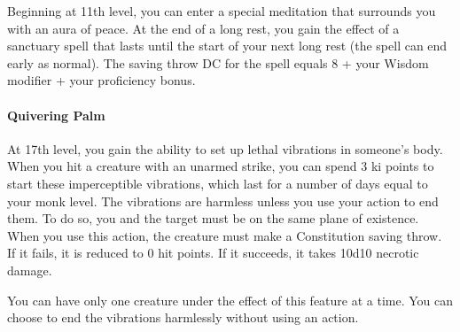 \documentclass[
]{article}
\begin{document}
Beginning at 11th level, you can enter a special meditation that
surrounds you with an aura of peace. At the end of a long rest, you gain
the effect of a sanctuary spell that lasts until the start of your next
long rest (the spell can end early as normal). The saving throw DC for
the spell equals 8 + your Wisdom modifier + your proficiency bonus.

\hypertarget{quivering-palm}{%
\paragraph{Quivering Palm}\label{quivering-palm}}

At 17th level, you gain the ability to set up lethal vibrations in
someone's body. When you hit a creature with an unarmed strike, you can
spend 3 ki points to start these imperceptible vibrations, which last
for a number of days equal to your monk level. The vibrations are
harmless unless you use your action to end them. To do so, you and the
target must be on the same plane of existence. When you use this action,
the creature must make a Constitution saving throw. If it fails, it is
reduced to 0 hit points. If it succeeds, it takes 10d10 necrotic damage.

You can have only one creature under the effect of this feature at a
time. You can choose to end the vibrations harmlessly without using an
action.
\end{document}

